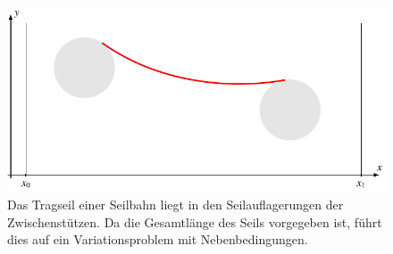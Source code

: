 %
%
%
\begin{figure}
\centering
\includegraphics{chapters/050-nebenbedingungen/images/seilbahn.pdf}
\caption{Das Tragseil einer Seilbahn liegt in den Seilauflagerungen der
Zwischenstützen.
Da die Gesamtlänge des Seils vorgegeben ist, führt dies auf ein
Variationsproblem mit Nebenbedingungen.
\label{buch:nebenbedingungen:fig:seilbahn}}
\end{figure}
